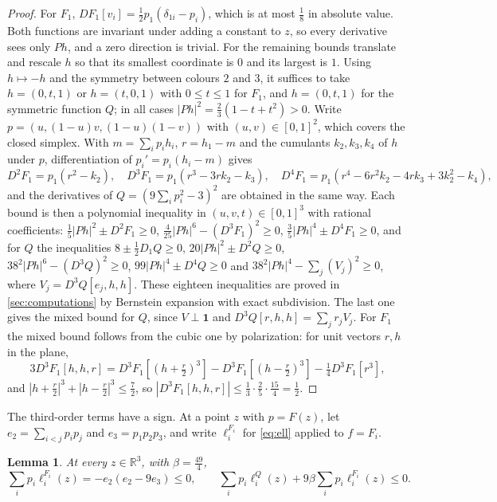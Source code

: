 \documentclass[11pt]{amsart}
\newtheorem{lemma}[theorem]{Lemma}
\theoremstyle{definition}
\theoremstyle{remark}
\newcommand{\R}{\mathbb{R}}
\newcommand{\one}{\mathbf{1}}
\begin{document}
\begin{proof}
For $F_1$, $DF_1[v_i]=\tfrac12p_1(\delta_{1i}-p_i)$, which is at most $\tfrac18$ in absolute value. Both functions
are invariant under adding a constant to $z$, so every derivative sees only $Ph$, and a zero direction is trivial.
For the remaining bounds translate and rescale $h$ so that its smallest coordinate is $0$ and its largest is $1$.
Using $h\mapsto-h$ and the symmetry between colours $2$ and $3$, it suffices to take $h=(0,t,1)$ or $h=(t,0,1)$
with $0\le t\le1$ for $F_1$, and $h=(0,t,1)$ for the symmetric function $Q$; in all cases
$|Ph|^2=\tfrac23(1-t+t^2)>0$. Write $p=(u,(1-u)v,(1-u)(1-v))$ with $(u,v)\in[0,1]^2$, which covers the closed
simplex. With $m=\sum_ip_ih_i$, $r=h_1-m$ and the cumulants $k_2,k_3,k_4$ of $h$ under $p$, differentiation of
$p_i'=p_i(h_i-m)$ gives
\[
D^2F_1=p_1(r^2-k_2),\quad D^3F_1=p_1(r^3-3rk_2-k_3),\quad D^4F_1=p_1(r^4-6r^2k_2-4rk_3+3k_2^2-k_4),
\]
and the derivatives of $Q=(9\sum_ip_i^2-3)^2$ are obtained in the same way. Each bound is then a polynomial
inequality in $(u,v,t)\in[0,1]^3$ with rational coefficients: $\tfrac15|Ph|^2\pm D^2F_1\ge0$,
$\tfrac4{25}|Ph|^6-(D^3F_1)^2\ge0$, $\tfrac35|Ph|^4\pm D^4F_1\ge0$, and for $Q$ the inequalities
$8\pm\tfrac12D_1Q\ge0$, $20|Ph|^2\pm D^2Q\ge0$, $38^2|Ph|^6-(D^3Q)^2\ge0$, $99|Ph|^4\pm D^4Q\ge0$ and
$38^2|Ph|^4-\sum_j(V_j)^2\ge0$, where $V_j=D^3Q[e_j,h,h]$. These eighteen inequalities are proved in
\cref{sec:computations} by Bernstein expansion with exact subdivision. The last one gives the mixed bound for
$Q$, since $V\perp\one$ and $D^3Q[r,h,h]=\sum_jr_jV_j$. For $F_1$ the mixed bound follows from the cubic one by
polarization: for unit vectors $r,h$ in the plane,
\[
3D^3F_1[h,h,r]=D^3F_1[(h+\tfrac r2)^{3}]-D^3F_1[(h-\tfrac r2)^{3}]-\tfrac14D^3F_1[r^{3}],
\]
and $|h+\tfrac r2|^3+|h-\tfrac r2|^3\le\tfrac72$, so $|D^3F_1[h,h,r]|\le\tfrac13\cdot\tfrac25\cdot\tfrac{15}4=\tfrac12$.
\end{proof}

The third-order terms have a sign. At a point $z$ with $p=F(z)$, let $e_2=\sum_{i<j}p_ip_j$ and $e_3=p_1p_2p_3$, and
write $\ell_i^{F_i}$ for \eqref{eq:ell} applied to $f=F_i$.

\begin{lemma}\label{lem:cubic}
At every $z\in\R^3$, with $\beta=\tfrac{49}4$,
\[
\sum_ip_i\ell_i^{F_i}(z)=-e_2(e_2-9e_3)\le0,\qquad
\sum_ip_i\ell_i^{Q}(z)+9\beta\sum_ip_i\ell_i^{F_i}(z)\le0.
\]
\end{lemma}
\end{document}
